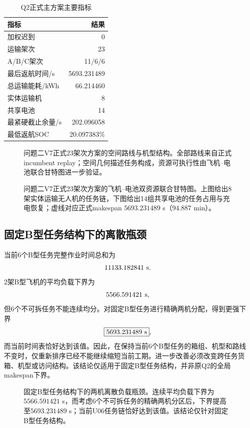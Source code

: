 \documentclass[UTF8,a4paper,12pt]{ctexart}
\begin{document}
\begin{table}[H]
\centering
\caption{Q2正式主方案主要指标}
\begin{tabular}{lr}
\toprule
指标 & 结果\\
\midrule
加权迟到 & 0\\
运输架次 & 23\\
A/B/C架次 & 11/6/6\\
最后返航时间/s & 5693.231489\\
总运输能耗/kWh & 66.214460\\
实体运输机 & 8\\
共享电池 & 14\\
最紧硬截止余量/s & 202.096058\\
最低返航SOC & 20.097383\%\\
\bottomrule
\end{tabular}
\end{table}

\begin{figure}[H]
  \centering
  \resizebox{0.86\textwidth}{!}{\QTwoFigRouteMap}
  \caption{问题二V7正式23架次方案的空间路线与机型结构。全部路线来自正式incumbent replay；空间几何描述任务构成，资源可执行性由飞机--电池联合甘特图进一步验证。}
  \label{fig:q2_route_map_v7}
\end{figure}

\begin{figure}[H]
  \centering
  \resizebox{0.98\textwidth}{!}{\QTwoFigGantt}
  \caption{问题二V7正式23架次方案的飞机--电池双资源联合甘特图。上图给出8架实体运输无人机的任务链，下图给出14组共享电池的任务占用与充电恢复；虚线对应正式makespan $5693.231489$ s（$94.887$ min）。}
  \label{fig:q2_gantt_v7}
\end{figure}

\subsection{固定B型任务结构下的离散瓶颈}

当前6个B型任务完整作业时间总和为
\[
11133.182841\ {\rm s}.
\]
2架B型飞机的平均负载下界为
\[
5566.591421\ {\rm s},
\]
但6个不可拆任务不能连续均分。对固定B型任务进行精确两机分配，得到更强下界
\[
\boxed{
5693.231489\ {\rm s}
},
\]
而当前时间表恰好达到该值。因此，在保持当前6个B型任务的箱组、机型和路线不变时，仅重新排序已经不能继续缩短当前工期。进一步改善必须改变跨任务货箱、机型或访问结构。该结论仅适用于固定B型任务结构，并非原Q2的全局makespan下界。

\begin{figure}[H]
  \centering
  \resizebox{0.86\textwidth}{!}{\QTwoFigBBottleneck}
  \caption{固定B型任务结构下的两机离散负载瓶颈。连续平均负载下界为$5566.591421$ s，而考虑6个不可拆任务的精确两机分区后，下界提高至$5693.231489$ s；当前U06任务链恰好达到该值。该结论仅针对固定B型任务结构。}
  \label{fig:q2_B_bottleneck_v7}
\end{figure}
\end{document}
